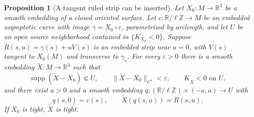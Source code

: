 \documentclass[11pt]{amsart}
\newtheorem{proposition}[theorem]{Proposition}
\theoremstyle{definition}
\newcommand{\R}{\mathbb R}
\DeclareMathOperator{\supp}{supp}
\begin{document}
\begin{proposition}[A tangent ruled strip can be inserted]
\label{prop:insert}
Let $X_0:M\to\R^3$ be a smooth embedding of a closed oriented
surface. Let $c:\R/\ell\mathbb Z\to M$ be an embedded asymptotic
curve with image $\gamma=X_0\circ c$, parametrized by arclength,
and let $U$ be an open source neighborhood contained in
$\{K_{X_0}<0\}$.
Suppose $R(s,u)=\gamma(s)+uV(s)$ is an embedded strip near $u=0$,
with $V(s)$ tangent to $X_0(M)$ and transverse to $\gamma_s$.
For every $\varepsilon>0$ there is a smooth embedding
$\widetilde X:M\to\R^3$ such that
\[
 \supp(\widetilde X-X_0)\Subset U,\qquad
 \|\widetilde X-X_0\|_{C^1}<\varepsilon,\qquad
 K_{\widetilde X}<0\text{ on }U,
\]
and there exist $a>0$ and a smooth embedding
$q:(\R/\ell\mathbb Z)\times(-a,a)\to U$ with
\[
 q(s,0)=c(s),\qquad \widetilde X(q(s,u))=R(s,u).
\]
If $X_0$ is tight, $\widetilde X$ is tight.
\end{proposition}
\end{document}
